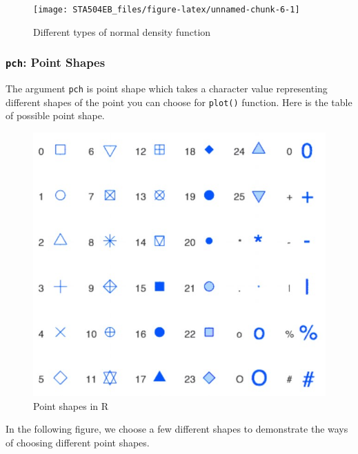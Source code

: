 \documentclass[
]{book}
\begin{document}
\begin{figure}

{\centering \texttt{[image: STA504EB\_files/figure-latex/unnamed-chunk-6-1]} 

}

\caption{Different types of normal density function}\label{fig:unnamed-chunk-6}
\end{figure}

\hypertarget{pch-point-shapes}{%
\subsubsection{\texorpdfstring{\texttt{pch}: Point Shapes}{pch: Point Shapes}}\label{pch-point-shapes}}

The argument \texttt{pch} is point shape which takes a character value representing different shapes of the point you can choose for \texttt{plot()} function. Here is the table of possible point shape.

\begin{figure}

{\centering \includegraphics[width=0.6\linewidth]{img01/w01-PointShape} 

}

\caption{Point shapes in R}\label{fig:unnamed-chunk-7}
\end{figure}

In the following figure, we choose a few different shapes to demonstrate the ways of choosing different point shapes.
\end{document}

